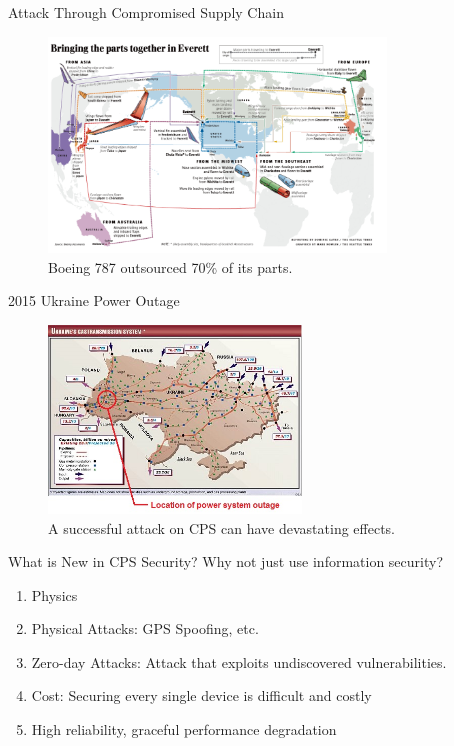 \documentclass[10pt]{beamer}
\begin{document}
\begin{frame}{Attack Through Compromised Supply Chain}
  \begin{figure}[ht]
    \centering
    \includegraphics[width=0.8\textwidth]{boeing.jpg}
    \caption{Boeing 787 outsourced 70\% of its parts.}
  \end{figure}
\end{frame}

\begin{frame}{2015 Ukraine Power Outage}
  \begin{figure}[<+htpb+>]
    \begin{center}
      \includegraphics[width=0.60\textwidth]{ukraine.jpg}
      \caption{A successful attack on CPS can have devastating effects.}
    \end{center}
  \end{figure}
\end{frame}

\begin{frame}{What is New in CPS Security?}
  Why not just use information security?
  \begin{enumerate}
  \item Physics
  \item Physical Attacks: GPS Spoofing, etc.
  \item Zero-day Attacks: Attack that exploits undiscovered vulnerabilities.
  \item Cost: Securing every single device is difficult and costly
  \item High reliability, graceful performance degradation
  \end{enumerate}
\end{frame}
\end{document}
